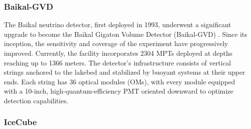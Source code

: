 
\subsubsection*{Baikal-GVD}

The Baikal neutrino detector, first deployed in 1993, underwent a significant upgrade to become the Baikal Gigaton Volume Detector (Baikal-GVD) \cite{Baikal}. Since its inception, the sensitivity and coverage of the experiment have progressively improved. Currently, the facility incorporates 2304 MPTs deployed at depths reaching up to 1366 meters. The detector’s infrastructure consists of vertical strings anchored to the lakebed and stabilized by buoyant systems at their upper ends. Each string has 36 optical modules (OMs), with every module equipped with a 10-inch, high-quantum-efficiency PMT oriented downward to optimize detection capabilities.

\subsubsection*{IceCube}


